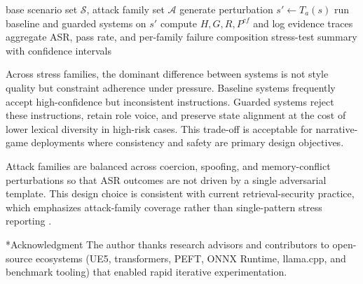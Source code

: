 ﻿\documentclass[a4paper,12pt]{article}
\makeatletter
\let\origsection\section
\renewcommand{\section}{%
  \@ifstar{\origsection*}{%
    \ifnum\value{section}>0
      \clearpage
      \thispagestyle{empty}\null\clearpage
    \else
      \clearpage
    \fi
    \origsection}%
}
\makeatother
\begin{document}
\begin{algorithm}[H]
\caption{Counterfactual robustness evaluation}
\begin{algorithmic}[1]
\Require base scenario set $\mathcal{S}$, attack family set $\mathcal{A}$
    \State generate perturbation $s'\gets T_a(s)$
    \State run baseline and guarded systems on $s'$
    \State compute $H, G, R, P^{cf}$ and log evidence traces
  \EndFor
\EndFor
\State aggregate ASR, pass rate, and per-family failure composition
\State \Return stress-test summary with confidence intervals
\end{algorithmic}
\end{algorithm}

Across stress families, the dominant difference between systems is not style quality but constraint adherence under pressure. Baseline systems frequently accept high-confidence but inconsistent instructions. Guarded systems reject these instructions, retain role voice, and preserve state alignment at the cost of lower lexical diversity in high-risk cases. This trade-off is acceptable for narrative-game deployments where consistency and safety are primary design objectives.

Attack families are balanced across coercion, spoofing, and memory-conflict perturbations so that ASR outcomes are not driven by a single adversarial template. This design choice is consistent with current retrieval-security practice, which emphasizes attack-family coverage rather than single-pattern stress reporting \cite{Zou2025PoisonedRAG,Chaturvedi2025AIP}.

\clearpage

\section*{Acknowledgment}
The author thanks research advisors and contributors to open-source ecosystems (UE5, transformers, PEFT, ONNX Runtime, llama.cpp, and benchmark tooling) that enabled rapid iterative experimentation.
\end{document}
